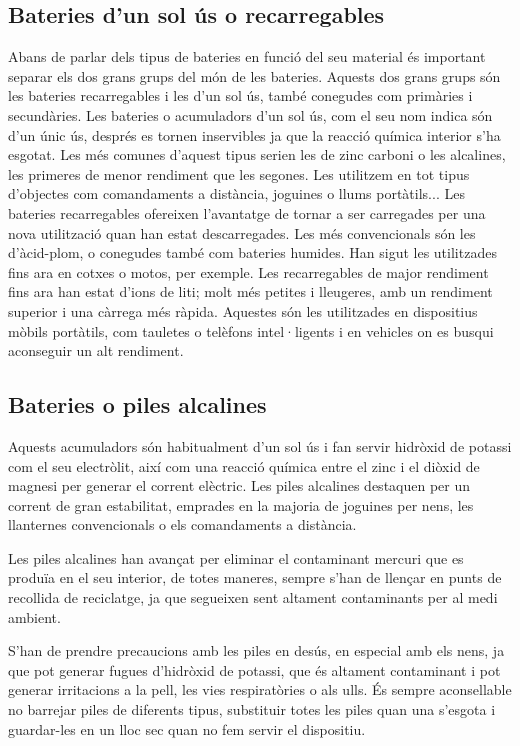 \subsection{Bateries d'un sol ús o recarregables}
Abans de parlar dels tipus de bateries en funció del seu material és important separar els dos grans grups del món de les bateries. Aquests dos grans grups són les bateries recarregables i les d'un sol ús, també conegudes com primàries i secundàries. Les bateries o acumuladors d'un sol ús, com el seu nom indica són d’un únic ús, després es tornen inservibles ja que la reacció química interior s’ha esgotat. Les més comunes d’aquest tipus serien les de zinc carboni o les alcalines, les primeres de menor rendiment que les segones. Les utilitzem en tot tipus d’objectes com comandaments a distància, joguines o llums portàtils... 
\smallskip \newline
Les bateries recarregables ofereixen l’avantatge de tornar a ser carregades per una nova utilització quan han estat descarregades. Les més convencionals són les d'àcid-plom, o conegudes també com bateries humides. Han sigut les utilitzades fins ara en cotxes o motos, per exemple. Les recarregables de major rendiment fins ara han estat d’ions de liti; molt més petites i lleugeres, amb un rendiment superior i una càrrega més ràpida. Aquestes són les utilitzades en dispositius mòbils portàtils, com tauletes o telèfons intel·ligents i en vehicles on es busqui aconseguir un alt rendiment.

\subsection{Bateries o piles alcalines}
Aquests acumuladors són habitualment d'un sol ús i fan servir hidròxid de potassi com el seu electròlit, així com una reacció química entre el zinc i el diòxid de magnesi per generar el corrent elèctric. Les piles alcalines destaquen per un corrent de gran estabilitat, emprades en la majoria de joguines per nens, les llanternes convencionals o els comandaments a distància.

Les piles alcalines han avançat per eliminar el contaminant mercuri que es produïa en el seu interior, de totes maneres, sempre s’han de llençar en punts de recollida de reciclatge, ja que segueixen sent altament contaminants per al medi ambient.

S’han de prendre precaucions amb les piles en desús, en especial amb els nens, ja que pot generar fugues d’hidròxid de potassi, que és altament contaminant i pot generar irritacions a la pell, les vies respiratòries o als ulls. És sempre aconsellable no barrejar piles de diferents tipus, substituir totes les piles quan una s’esgota i guardar-les en un lloc sec quan no fem servir el dispositiu.

